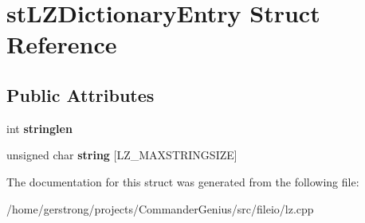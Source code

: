 \hypertarget{structst_l_z_dictionary_entry}{
\section{stLZDictionaryEntry Struct Reference}
\label{structst_l_z_dictionary_entry}
}
\subsection*{Public Attributes}
\begin{DoxyCompactItemize}
\item 
\hypertarget{structst_l_z_dictionary_entry_a56dc41ff74ad255009d9aa84757719f1}{
int {\bfseries stringlen}}
\label{structst_l_z_dictionary_entry_a56dc41ff74ad255009d9aa84757719f1}

\item 
\hypertarget{structst_l_z_dictionary_entry_aab6226c70c04d1dc3ee95fc1a6d9b8b5}{
unsigned char {\bfseries string} \mbox{[}LZ\_\-MAXSTRINGSIZE\mbox{]}}
\label{structst_l_z_dictionary_entry_aab6226c70c04d1dc3ee95fc1a6d9b8b5}

\end{DoxyCompactItemize}


The documentation for this struct was generated from the following file:\begin{DoxyCompactItemize}
\item 
/home/gerstrong/projects/CommanderGenius/src/fileio/lz.cpp\end{DoxyCompactItemize}
